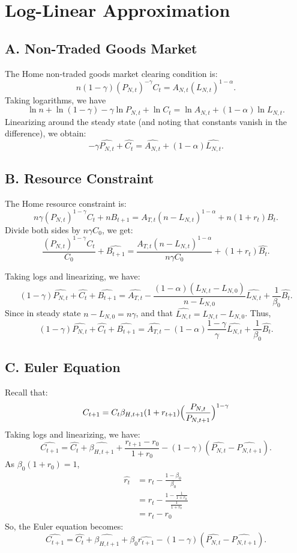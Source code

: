 \documentclass[a4paper,12pt]{article} %
\theoremstyle{nonitalic}
\begin{document}
\section{Log-Linear Approximation}
\subsection*{A. Non-Traded Goods Market}
The Home non-traded goods market clearing condition is:
\[
n(1-\gamma)(P_{N,t})^{-\gamma}C_t = A_{N,t}(L_{N,t})^{1-\alpha}.
\]
Taking logarithms, we have
\[
\ln n + \ln(1-\gamma) - \gamma\ln P_{N,t} + \ln C_t = \ln A_{N,t} + (1-\alpha)\ln L_{N,t}.
\]
Linearizing around the steady state (and noting that constants vanish in the difference), we obtain:
\[
\boxed{-\gamma  \widehat{P_{N,t}} + \widehat{C_t} =  \widehat{A_{N,t}} + (1-\alpha)  \widehat{L_{N,t}}. \tag{7a}}
\]

\subsection*{B. Resource Constraint}
The Home resource constraint is:
\[
n\gamma (P_{N,t})^{1-\gamma}C_t + nB_{t+1} = A_{T,t}(n-L_{N,t})^{1-\alpha}+ n(1+r_t)B_t.
\]
Divide both sides by $n \gamma C_0$, we get:
\[
\frac{(P_{N,t})^{1-\gamma}C_t}{C_0} + \widehat{B_{t+1}} = \frac{A_{T,t}(n-L_{N,t})^{1-\alpha}}{n\gamma C_0} + (1+r_t)\widehat{B_t}.
\]

Taking logs and linearizing, we have:
\[
(1-\gamma)  \widehat{P_{N,t}} + \widehat{C_t} + \widehat{B_{t+1}} = \widehat{A_{T,t}} - \frac{(1-\alpha)(L_{N,t} - L_{N,0})}{n-L_{N,0}}  \widehat{L_{N,t}} + \frac{1}{\beta_0} \widehat{B_t}.
\]
Since in steady state $n-L_{N,0}= n\gamma$, and that $\widehat{L_{N,t}} = L_{N,t} - L_{N,0}$. Thus,
\[
\boxed{(1-\gamma)  \widehat{P_{N,t}} + \widehat{C_t} + \widehat{B_{t+1}} = \widehat{A_{T,t}} - (1-\alpha) \frac{1 - \gamma}{\gamma} \widehat{L_{N,t}} + \frac{1}{\beta_0} \widehat{B_t}. \tag{7c}}
\]


\subsection*{C. Euler Equation}
Recall that:
\[
C_{t+1} = C_t \beta_{H, t+1}(1+r_{t+1})\Bigl(\frac{P_{N,t}}{P_{N,t+1}}\Bigr)^{1-\gamma}
\]
Taking logs and linearizing, we have:
\[
\widehat{C_{t+1}} = \widehat{C_t} + \widehat{\beta_{H,t+1}} + \frac{r_{t+1}-r_0}{1+r_0} - (1-\gamma)( \widehat{P_{N,t}}- \widehat{P_{N,t+1}}).
\]
As $\beta_0(1+r_0) = 1$,
\begin{align*}
    \widehat{r_t} &= r_t - \frac{1-\beta_0}{\beta_0} \\
    &= r_t - \frac{1-\frac{1}{1+r_0}}{\frac{1}{1+r_0}} \\
    &= r_t - r_0
\end{align*}
So, the Euler equation becomes:
\[
\boxed{\widehat{C_{t+1}} = \widehat{C_t} + \widehat{\beta_{H,t+1}} + \beta_0  \widehat{r_{t+1}} - (1-\gamma)( \widehat{P_{N,t}}- \widehat{P_{N,t+1}}). \tag{7e}}
\]
\end{document}
